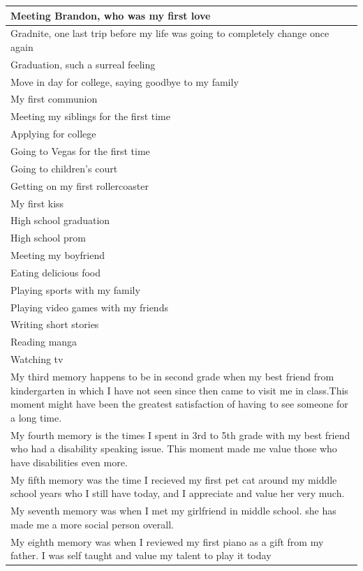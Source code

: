 \documentclass[
  .7em,
  letterpaper,
  DIV=11,
  numbers=noendperiod]{scrartcl}
\begin{document}
\begin{table}
\begin{tabular}{l}
\hline
Meeting Brandon, who was my first love\\
\hline
Gradnite, one last trip before my life was going to completely change once again\\
\hline
Graduation, such a surreal feeling\\
\hline
Move in day for college, saying goodbye to my family\\
\hline
My first communion\\
\hline
Meeting my siblings for the first time\\
\hline
Applying for college\\
\hline
Going to Vegas for the first time\\
\hline
Going to children's court\\
\hline
Getting on my first rollercoaster\\
\hline
My first kiss\\
\hline
High school graduation\\
\hline
High school prom\\
\hline
Meeting my boyfriend\\
\hline
Eating delicious food\\
\hline
Playing sports with my family\\
\hline
Playing video games with my friends\\
\hline
Writing short stories\\
\hline
Reading manga\\
\hline
Watching tv\\
\hline
My third memory happens to be in second grade when my best friend from kindergarten in which I have not seen since then came to visit me in class.This moment might have been the greatest satisfaction of having to see someone for a long time.\\
\hline
My fourth memory is the times I spent in 3rd to 5th grade with my best friend who had a disability speaking issue. This moment made me value those who have disabilities even more.\\
\hline
My fifth memory was the time I recieved my first pet cat around my middle school years who I still have today, and I appreciate and value her very much.\\
\hline
My seventh memory was when I met my girlfriend in middle school. she has made me a more social person overall.\\
\hline
My eighth memory was when I reviewed my first piano as a gift from my father. I was self taught and value my talent to play it today\\

\end{tabular}
\end{table}
\end{document}
